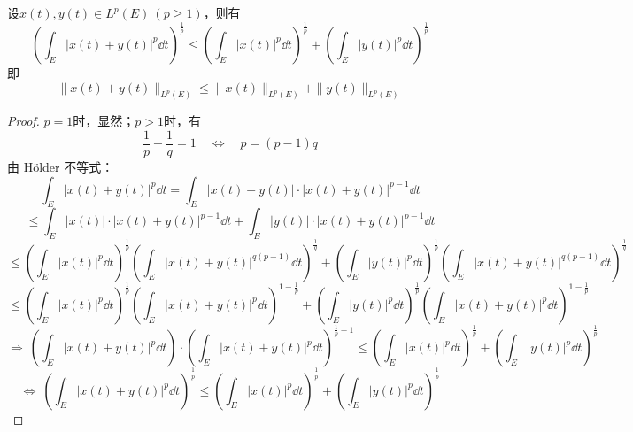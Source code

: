 \begin{theorem}
设$x(t),y(t) \in L^p(E) \ (p \geq 1)$，则有
\[\left(\int_E|x(t)+y(t)|^p\dd t\right)^{\frac{1}{p}} \leq \left(\int_E|x(t)|^p\dd t\right)^{\frac{1}{p}}+\left(\int_E|y(t)|^p\dd t\right)^{\frac{1}{p}}\]
即
\[\|x(t)+y(t)\|_{L^p(E)} \leq \|x(t)\|_{L^p(E)}+\|y(t)\|_{L^p(E)}\]
\end{theorem}
\begin{proof}
$p=1$时，显然；$p>1$时，有
\[\frac{1}{p}+\frac{1}{q}=1 \quad \Leftrightarrow \quad p=(p-1)q\]
由 H\"{o}lder 不等式：
\[\int_E|x(t)+y(t)|^p\dd t=\int_E|x(t)+y(t)|\cdot|x(t)+y(t)|^{p-1}\dd t\]
\[\leq \int_E|x(t)|\cdot|x(t)+y(t)|^{p-1}\dd t+\int_E|y(t)|\cdot|x(t)+y(t)|^{p-1}\dd t\]
\[\leq \left(\int_E|x(t)|^p\dd t\right)^{\frac{1}{p}}\left(\int_E|x(t)+y(t)|^{q(p-1)}\dd t\right)^{\frac{1}{q}}+\left(\int_E|y(t)|^p\dd t\right)^{\frac{1}{p}}\left(\int_E|x(t)+y(t)|^{q(p-1)}\dd t\right)^{\frac{1}{q}}\]
\[\leq \left(\int_E|x(t)|^p\dd t\right)^{\frac{1}{p}}\left(\int_E|x(t)+y(t)|^{p}\dd t\right)^{1-\frac{1}{p}}+\left(\int_E|y(t)|^p\dd t\right)^{\frac{1}{p}}\left(\int_E|x(t)+y(t)|^{p}\dd t\right)^{1-\frac{1}{p}}\]
\[\Rightarrow \ \left(\int_E|x(t)+y(t)|^p\dd t\right) \cdot \left(\int_E|x(t)+y(t)|^{p}\dd t\right)^{\frac{1}{p}-1} \leq \left(\int_E|x(t)|^p\dd t\right)^{\frac{1}{p}}+\left(\int_E|y(t)|^p\dd t\right)^{\frac{1}{p}}\]
\[\Leftrightarrow \ \left(\int_E|x(t)+y(t)|^{p}\dd t\right)^{\frac{1}{p}} \leq \left(\int_E|x(t)|^p\dd t\right)^{\frac{1}{p}}+\left(\int_E|y(t)|^p\dd t\right)^{\frac{1}{p}}\]
\end{proof}

\newpage
